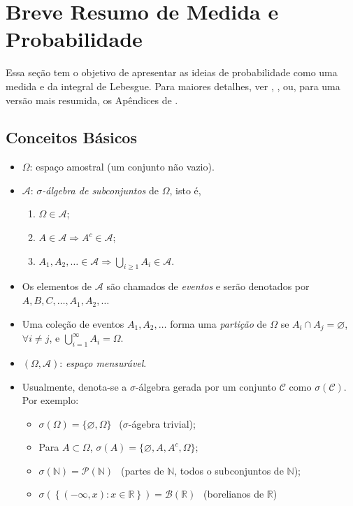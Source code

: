 \documentclass[
]{book}
\providecommand{\tightlist}{%
  \setlength{\itemsep}{0pt}\setlength{\parskip}{0pt}}
\begin{document}
\hypertarget{medprob}{%
\chapter{Breve Resumo de Medida e Probabilidade}\label{medprob}}

Essa seção tem o objetivo de apresentar as ideias de probabilidade como uma medida e da integral de Lebesgue. Para maiores detalhes, ver \citet{Ash00}, \citet{Billingsley86}, \citet{Shiryaev96} ou, para uma versão mais resumida, os Apêndices de \citet{Schervish12}.

\hypertarget{basprob}{%
\section{Conceitos Básicos}\label{basprob}}

\begin{itemize}
\item
  \(\Omega\): espaço amostral (um conjunto não vazio).
\item
  \(\mathcal{A}\): \emph{\(\sigma\)-álgebra de subconjuntos} de \(\Omega\), isto é,

  \begin{enumerate}
  \def\labelenumi{\arabic{enumi}.}
  \tightlist
  \item
    \(\Omega \in \mathcal{A}\);
  \item
    \(A \in \mathcal{A} \Longrightarrow A^{c} \in \mathcal{A}\);
  \item
    \(\displaystyle A_1, A_2, \ldots \in \mathcal{A} \Longrightarrow \bigcup_{i\geq1} A_i \in \mathcal{A}\).
  \end{enumerate}
\item
  Os elementos de \(\mathcal{A}\) são chamados de \emph{eventos} e serão denotados por \(A, B, C, \ldots, A_1, A_2, \ldots\)
\item
  Uma coleção de eventos \(A_1,A_2,\ldots\) forma uma \emph{partição} de \(\Omega\) se \(A_i \cap A_j = \varnothing\), \(\forall i \neq j\), e \(\displaystyle \bigcup_{i=1}^{\infty} A_i = \Omega\).
\item
  \((\Omega, \mathcal{A})\): \emph{espaço mensurável}.
\item
  Usualmente, denota-se a \(\sigma\)-álgebra gerada por um conjunto \(\mathcal{C}\) como \(\sigma(\mathcal{C})\). Por exemplo:

  \begin{itemize}
  \tightlist
  \item
    \(\sigma(\Omega) = \{\varnothing,\Omega\}~~\) (\(\sigma\)-ágebra trivial);
  \item
    Para \(A \subset \Omega\), \(\sigma(A) = \{\varnothing, A, A^c, \Omega\}\);
  \item
    \(\sigma(\mathbb{N}) = \mathcal{P}(\mathbb{N})~~\) (partes de \(\mathbb{N}\), todos o subconjuntos de \(\mathbb{N}\));
  \item
    \(\sigma\left(\left\{(-\infty,x): x \in \mathbb{R}\right\}\right) = \mathcal{B}\left(\mathbb{R}\right)~~\) (borelianos de \(\mathbb{R}\))
  \end{itemize}
\end{itemize}
\end{document}
